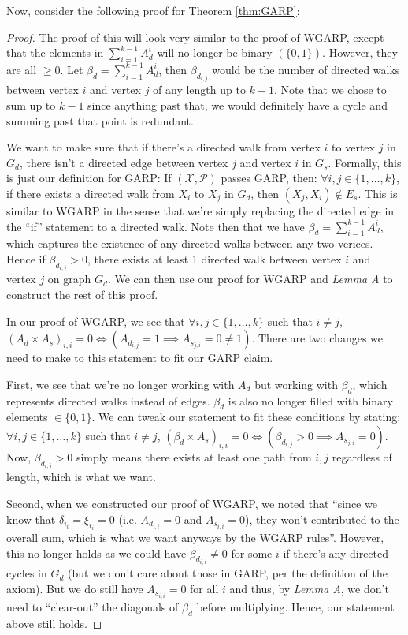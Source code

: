 \documentclass{article} %
\theoremstyle{style1}
\theoremstyle{style1}
\theoremstyle{example}
\begin{document}
Now, consider the following proof for Theorem \ref{thm:GARP}:
\begin{proof}
The proof of this will look very similar to the proof of WGARP, except that the elements in $\sum_{i=1}^{k-1}A_{d}^{i}$ will no longer be binary $(\{0,1\})$. However, they are all $\geq0$. Let $\beta_d=\sum_{i=1}^{k-1}A_{d}^{i}$, then $\beta_{d_{i,j}}$ would be the number of directed walks between vertex $i$ and vertex $j$ of any length up to $k-1$. Note that we chose to sum up to $k-1$ since anything past that, we would definitely have a cycle and summing past that point is redundant.


We want to make sure that if there's a directed walk from vertex $i$ to vertex $j$ in $G_d$, there isn't a directed edge between vertex $j$ and vertex $i$ in $G_s$. Formally, this is just our definition for GARP: If $(\mathcal{X},\mathcal{P})$ passes GARP, then: $\forall i,j\in\{1,\dots,k\}$, if there exists a directed walk from $X_i$ to $X_j$ in $G_d$, then $(X_j,X_i)\not\in E_s$. This is similar to WGARP in the sense that we're simply replacing the directed edge in the ``if'' statement to a directed walk. Note then that we have $\beta_d=\sum_{i=1}^{k-1}A_{d}^{i}$, which captures the existence of any directed walks between any two verices. Hence if $\beta_{d_{i,j}}>0$, there exists at least 1 directed walk between vertex $i$ and vertex $j$ on graph $G_d$. We can then use our proof for WGARP and \textit{Lemma A} to construct the rest of this proof.


In our proof of WGARP, we see that $\forall i, j\in\{1,\ldots,k\}$ such that $i\not=j$, $(A_d\times A_s)_{i,i}=0 \iff (A_{d_{i,j}}=1 \implies A_{s_{j,i}}=0\not=1)$. There are two changes we need to make to this statement to fit our GARP claim. 

First, we see that we're no longer working with $A_d$ but working with $\beta_d$, which represents directed walks instead of edges. $\beta_d$ is also no longer filled with binary elements $\in\{0,1\}$. We can tweak our statement to fit these conditions by stating: $\forall i, j\in\{1,\ldots,k\}$ such that $i\not=j$, $(\beta_d\times A_s)_{i,i}=0 \iff (\beta_{d_{i,j}}>0 \implies A_{s_{j,i}}=0)$. Now, $\beta_{d_{i,j}}>0$ simply means there exists at least one path from $i,j$ regardless of length, which is what we want.

Second, when we constructed our proof of WGARP, we noted that ``since we know that $\delta_{i_i}=\xi_{i_i}=0$ (i.e. $A_{d_{i,i}}=0$ and $A_{s_{i,i}}=0$), they won't contributed to the overall sum, which is what we want anyways by the WGARP rules''. However, this no longer holds as we could have $\beta_{d_{i,i}}\not=0$ for some $i$ if there's any directed cycles in $G_d$ (but we don't care about those in GARP, per the definition of the axiom). But we do still have $A_{s_{i,i}}=0$ for all $i$ and thus, by \textit{Lemma A}, we don't need to ``clear-out'' the diagonals of $\beta_d$ before multiplying. Hence, our statement above still holds. 


\end{proof}
\end{document}
